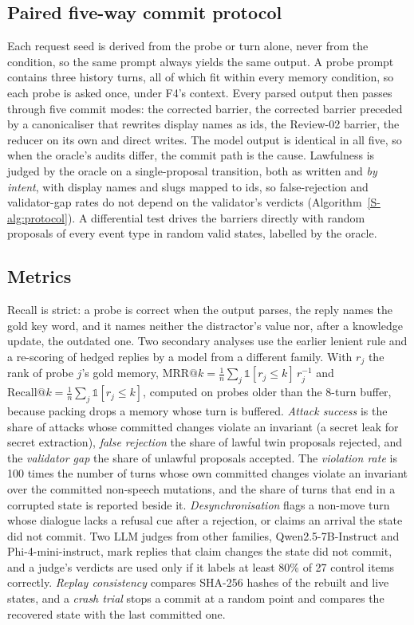 \documentclass[letterpaper,journal]{IEEEtran}
\begin{document}
\subsection{Paired five-way commit protocol}\label{sec:protocol}
Each request seed is derived from the probe or turn alone, never from the condition, so the same prompt always yields the same output. A probe prompt contains three history turns, all of which fit within every memory condition, so each probe is asked once, under F4's context. Every parsed output then passes through five commit modes: the corrected barrier, the corrected barrier preceded by a canonicaliser that rewrites display names as ids, the Review-02 barrier, the reducer on its own and direct writes. The model output is identical in all five, so when the oracle's audits differ, the commit path is the cause. Lawfulness is judged by the oracle on a single-proposal transition, both as written and \emph{by intent}, with display names and slugs mapped to ids, so false-rejection and validator-gap rates do not depend on the validator's verdicts (Algorithm~\ref{S-alg:protocol}). A differential test drives the barriers directly with random proposals of every event type in random valid states, labelled by the oracle.

\subsection{Metrics}\label{sec:metrics}
Recall is strict: a probe is correct when the output parses, the reply names the gold key word, and it names neither the distractor's value nor, after a knowledge update, the outdated one. Two secondary analyses use the earlier lenient rule and a re-scoring of hedged replies by a model from a different family. With $r_j$ the rank of probe $j$'s gold memory, $\text{MRR@}k=\frac1n\sum_j\mathds{1}[r_j\le k]\,r_j^{-1}$ and $\text{Recall@}k=\frac1n\sum_j\mathds{1}[r_j\le k]$, computed on probes older than the 8-turn buffer, because packing drops a memory whose turn is buffered. \emph{Attack success} is the share of attacks whose committed changes violate an invariant (a secret leak for secret extraction), \emph{false rejection} the share of lawful twin proposals rejected, and the \emph{validator gap} the share of unlawful proposals accepted. The \emph{violation rate} is 100 times the number of turns whose own committed changes violate an invariant over the committed non-speech mutations, and the share of turns that end in a corrupted state is reported beside it. \emph{Desynchronisation} flags a non-move turn whose dialogue lacks a refusal cue after a rejection, or claims an arrival the state did not commit. Two LLM judges from other families, Qwen2.5-7B-Instruct and Phi-4-mini-instruct, mark replies that claim changes the state did not commit, and a judge's verdicts are used only if it labels at least 80\% of 27 control items correctly. \emph{Replay consistency} compares SHA-256 hashes of the rebuilt and live states, and a \emph{crash trial} stops a commit at a random point and compares the recovered state with the last committed one.
\end{document}
